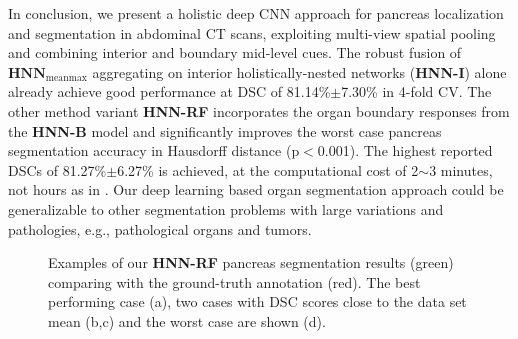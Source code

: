 \documentclass[journal]{IEEEtran}
\begin{document}
In conclusion, we present a holistic deep CNN approach for pancreas localization and segmentation in abdominal CT scans, exploiting multi-view spatial pooling and combining interior and boundary mid-level cues. The robust fusion of $\mathbf{HNN}_\mathrm{meanmax}$ aggregating on interior holistically-nested networks ({\bf HNN-I}) alone already achieve good performance at DSC of 81.14\%$\pm$7.30\% in 4-fold CV. The other method variant \textbf{HNN-RF} incorporates the organ boundary responses from the {\bf HNN-B} model and significantly improves the worst case pancreas segmentation accuracy in Hausdorff distance (p$<$0.001). The highest reported DSCs of 81.27\%$\pm$6.27\% is achieved, at the computational cost of 2$\sim$3 minutes, not hours as in \cite{Wang2014Miccai,Chu2013Miccai,wolz2013automated}. Our deep learning based organ segmentation approach could be generalizable to other segmentation problems with large variations and pathologies, e.g., pathological organs and tumors.
\begin{figure*}[htb]\centering	{}
	\caption{\small Examples of our \textbf{HNN-RF} pancreas segmentation results (green) comparing with the ground-truth annotation (red). The best performing case (a), two cases with DSC scores close to the data set mean (b,c) and the worst case are shown (d).}
	\label{fig:axial_examples}
\end{figure*}
  
\end{document}
